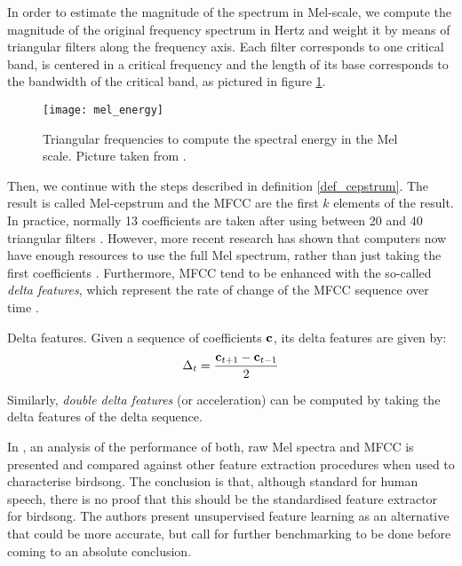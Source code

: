 \documentclass[../main.tex]{subfiles}
\begin{document}
\par In order to estimate the magnitude of the spectrum in Mel-scale, we compute the magnitude of the original frequency spectrum in Hertz and weight it by means of triangular filters along the frequency axis. Each filter corresponds to one critical band, is centered in a critical frequency and the length of its base corresponds to the bandwidth of the critical band, as pictured in figure \ref{mel_energy}.


\begin{figure}[t]
\texttt{[image: mel\_energy]}
\caption{Triangular frequencies to compute the spectral energy in the Mel scale. Picture taken from \cite{Sludge2000}.}
\label{mel_energy}
\end{figure}

\par Then, we continue with the steps described in definition \ref{def_cepstrum}. The result is called Mel-cepstrum and the MFCC are the first $k$ elements of the result. In practice, normally 13 coefficients are taken after using between 20 and 40 triangular filters \cite{Gutierrez-Osuna2009}. However, more recent research has shown that computers now have enough resources to use the full Mel spectrum, rather than just taking the first coefficients \cite{Stowell2014}. Furthermore, MFCC tend to be enhanced with the so-called \emph{delta features}, which represent the rate of change of the MFCC sequence over time \cite{Muda2010} \cite{Lyons2014}. 
\begin{definition}{Delta features.} \label{def_delta_mfcc}
Given a sequence of coefficients $\mathbf{c}$, its delta features are given by:
\begin{align*}
\Delta_t = \frac{\mathbf{c}_{t+1} - \mathbf{c}_{t-1}}{2}
\end{align*}
\end{definition}
\par Similarly, \emph{double delta features} (or acceleration) can be computed by taking the delta features of the delta sequence. 
\par In \cite{Stowell2014}, an analysis of the performance of both, raw Mel spectra and MFCC is presented and compared against other feature extraction procedures when used to characterise birdsong. The conclusion is that, although standard for human speech, there is no proof that this should be the standardised feature extractor for birdsong. The authors present unsupervised feature learning as an alternative that could be more accurate, but call for further benchmarking to be done before coming to an absolute conclusion.
\end{document}
